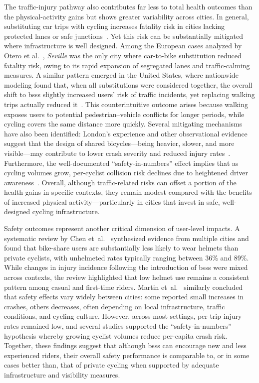     The traffic-injury pathway also contributes far less to total health outcomes than the physical-activity gains but shows greater variability across cities. In general, substituting car trips with cycling increases fatality risk in cities lacking protected lanes or safe junctions~\cite{Otero2018}. Yet this risk can be substantially mitigated where infrastructure is well designed. Among the European cases analyzed by Otero et al.~\cite{Otero2018}, \textit{Seville} was the only city where car-to-bike substitution reduced fatality risk, owing to its rapid expansion of segregated lanes and traffic-calming measures. A similar pattern emerged in the United States, where nationwide modeling found that, when all substitutions were considered together, the overall shift to \acp{bss} slightly increased users’ risk of traffic incidents, yet replacing walking trips actually reduced it~\cite{Clockston2021}. This counterintuitive outcome arises because walking exposes users to potential pedestrian–vehicle conflicts for longer periods, while cycling covers the same distance more quickly. Several mitigating mechanisms have also been identified: London’s experience and other observational evidence suggest that the design of shared bicycles—being heavier, slower, and more visible—may contribute to lower crash severity and reduced injury rates~\cite{Woodcock2014}. Furthermore, the well-documented “safety-in-numbers” effect implies that as cycling volumes grow, per-cyclist collision risk declines due to heightened driver awareness~\cite{Jacobsen2015}. Overall, although traffic-related risks can offset a portion of the health gains in specific contexts, they remain modest compared with the benefits of increased physical activity—particularly in cities that invest in safe, well-designed cycling infrastructure.

    Safety outcomes represent another critical dimension of user-level impacts. A systematic review by Chen et~al.~\cite{Chen2020} synthesized evidence from multiple cities and found that bike-share users are substantially less likely to wear helmets than private cyclists, with unhelmeted rates typically ranging between 36\% and 89\%. While changes in injury incidence following the introduction of \acp{bss} were mixed across contexts, the review highlighted that low helmet use remains a consistent pattern among casual and first-time riders. Martin et~al.~\cite{Martin2016} similarly concluded that safety effects vary widely between cities: some reported small increases in crashes, others decreases, often depending on local infrastructure, traffic conditions, and cycling culture. However, across most settings, per-trip injury rates remained low, and several studies supported the “safety-in-numbers” hypothesis whereby growing cyclist volumes reduce per-capita crash risk. Together, these findings suggest that although \acp{bss} can encourage new and less experienced riders, their overall safety performance is comparable to, or in some cases better than, that of private cycling when supported by adequate infrastructure and visibility measures.


